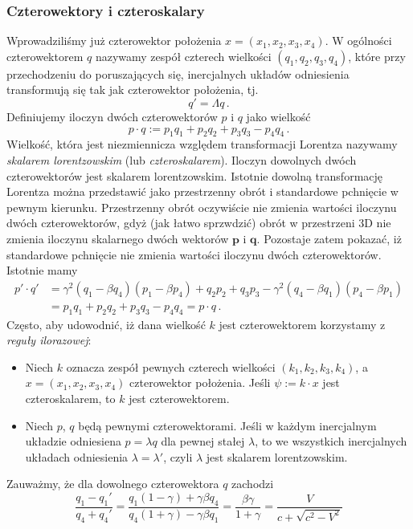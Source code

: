 \documentclass[../main.tex]{subfiles}
\begin{document}
\subsubsection{Czterowektory i czteroskalary}
Wprowadziliśmy już czterowektor położenia \(x=(x_1,x_2,x_3,x_4)\). W ogólności czterowektorem \(q\)
nazywamy zespół czterech wielkości \((q_1,q_2,q_3,q_4)\), które przy przechodzeniu do poruszających
się, inercjalnych układów odniesienia transformują się tak jak czterowektor położenia, tj.
\begin{equation*}
    q'=\Lambda q\,.
\end{equation*}
Definiujemy iloczyn dwóch czterowektorów \(p\) i \(q\) jako wielkość
\begin{equation*}
    p\cdot q:=p_1q_1+p_2q_2+p_3q_3-p_4q_4\,.
\end{equation*}
Wielkość, która jest niezmiennicza względem transformacji Lorentza nazywamy \textit{skalarem
lorentzowskim} (lub \textit{czteroskalarem}). Iloczyn dowolnych dwóch czterowektorów jest skalarem
lorentzowskim. Istotnie dowolną transformację Lorentza można przedstawić jako przestrzenny obrót i
standardowe pchnięcie w pewnym kierunku. Przestrzenny obrót oczywiście nie zmienia wartości iloczynu
dwóch czterowektorów, gdyż (jak łatwo sprzwdzić) obrót w przestrzeni 3D nie zmienia iloczynu
skalarnego dwóch wektorów \(\mathbf{p}\) i \(\mathbf{q}\). Pozostaje zatem pokazać, iż standardowe
pchnięcie nie zmienia wartości iloczynu dwóch czterowektorów. Istotnie mamy
\begin{equation*}
\begin{split}
    p'\cdot q'&=\gamma^2(q_1-\beta q_4)(p_1-\beta p_4)+q_2p_2+q_3p_3-\gamma^2(q_4-\beta q_1)(p_4-\beta p_1)\\
    &=p_1q_1+p_2q_2+p_3q_3-p_4q_4=p\cdot q\,.
\end{split}
\end{equation*}
Często, aby udowodnić, iż dana wielkość \(k\) jest czterowektorem korzystamy z \textit{reguły
ilorazowej}:\\
\begin{itemize}
    \item Niech \(k\) oznacza zespół pewnych czterech wielkości \((k_1,k_2,k_3,k_4)\), a
    \(x=(x_1,x_2,x_3,x_4)\) czterowektor położenia. Jeśli \(\psi:=k\cdot x\) jest czteroskalarem, to
    \(k\) jest czterowektorem.
    \item Niech \(p\), \(q\) będą pewnymi czterowektorami. Jeśli w każdym inercjalnym układzie
    odniesiena \(p=\lambda q\) dla pewnej stałej \(\lambda\), to we wszystkich inercjalnych układach
    odniesienia \(\lambda=\lambda'\), czyli \(\lambda\) jest skalarem lorentzowskim.
\end{itemize}
Zauważmy, że dla dowolnego czterowektora \(q\) zachodzi
\begin{equation*}
    \frac{q_1-q_1'}{q_4+q_4'}=\frac{q_1(1-\gamma)+\gamma\beta q_4}{q_4(1+\gamma)-\gamma\beta q_1}=\frac{\beta\gamma}{1+\gamma}=\frac{V}{c+\sqrt{c^2-V^2}}
\end{equation*}
\end{document}
